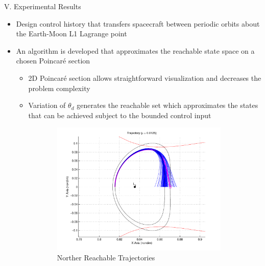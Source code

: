 \documentclass[final, usenames, dvipsnames]{beamer}
\newlength{\onecolwidth}
\begin{document}
\begin{frame}[t]
\begin{columns}[T,onlytextwidth]
\begin{column}{\onecolwidth}
\begin{block}{V. Experimental Results} %
	\begin{itemize}
		\item Design control history that transfers spacecraft between periodic orbits about the Earth-Moon L1 Lagrange point
		\item An algorithm is developed that approximates the reachable state space on a chosen Poincar\'e section
		\begin{itemize}
			\item 2D Poincar\'e section allows straightforward visualization and decreases the problem complexity
			\item Variation of \( \theta_d \) generates the reachable set which approximates the states that can be achieved subject to the bounded control input
		\end{itemize}
		\begin{figure}
        	\centering
        	\begin{subfigure}[b]{0.46\columnwidth}
        		\includegraphics[width=\columnwidth]{north_reach_trajectory}
        		\caption*{Norther Reachable Trajectories}
        		\label{fig:north_trajectory}
        	\end{subfigure}%
			~%
			\begin{subfigure}[b]{0.46\columnwidth}

\end{subfigure}
\end{figure}
\end{itemize}
\end{block}
\end{column}
\end{columns}
\end{frame}
\end{document}
